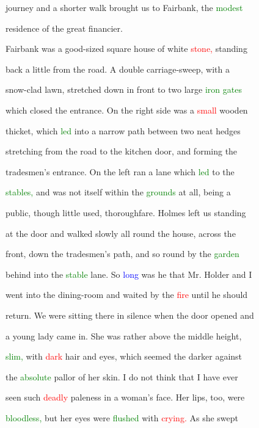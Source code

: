  \textcolor{BurntOrange}{journey} and a shorter walk brought us to Fairbank, the \textcolor{green}{modest}

 residence of the great financier.



 Fairbank was a good-sized square house of \textcolor{BurntOrange}{white} \textcolor{red}{stone,} standing

 back a little from the road. A double carriage-sweep, with a

 snow-clad lawn, stretched down in front to two large \textcolor{green}{iron} \textcolor{green}{gates}

 which closed the entrance. On the right side was a \textcolor{red}{small} wooden

 thicket, which \textcolor{green}{led} into a narrow path between two neat hedges

 stretching from the road to the kitchen door, and forming the

 tradesmen's entrance. On the left ran a lane which \textcolor{green}{led} to the

 \textcolor{green}{stables,} and was not itself within the \textcolor{green}{grounds} at all, being a

 \textcolor{BurntOrange}{public,} though little used, thoroughfare. Holmes left us standing

 at the door and walked slowly all round the house, across the

 front, down the tradesmen's path, and so round by the \textcolor{green}{garden}

 behind into the \textcolor{green}{stable} lane. So \textcolor{blue}{long} was he that Mr. Holder and I

 went into the dining-room and \textcolor{BurntOrange}{waited} by the \textcolor{red}{fire} until he should

 return. We were sitting there in silence when the door opened and

 a \textcolor{BurntOrange}{young} lady came in. She was rather above the middle height,

 \textcolor{green}{slim,} with \textcolor{red}{dark} hair and eyes, which seemed the darker against

 the \textcolor{green}{absolute} pallor of her skin. I do not think that I have ever

 seen such \textcolor{red}{deadly} paleness in a woman's face. Her lips, too, were

 \textcolor{green}{bloodless,} but her eyes were \textcolor{green}{flushed} with \textcolor{red}{crying.} As she swept

